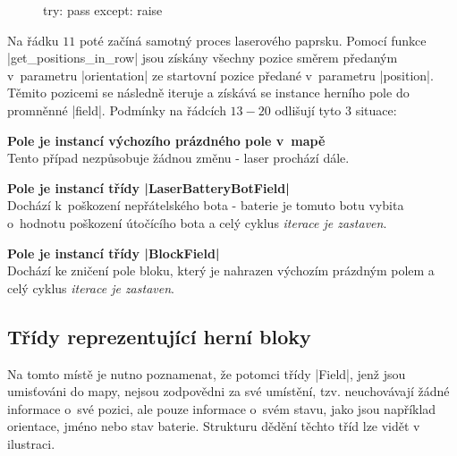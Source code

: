 {\begin{figure}[!h]
\begin{minipage}[b][50\lineheight]{.47\textwidth}
    \begin{code}
try:
    pass
except:
    raise
    \end{code}
    \end{minipage}
    
\end{figure}

\begin{sloppypar}
    Na řádku $11$ poté začíná samotný proces laserového paprsku. Pomocí funkce \ic|get_positions_in_row| jsou získány všechny pozice směrem předaným v~parametru \ic|orientation| ze startovní pozice předané v~parametru \ic|position|. Těmito pozicemi se následně iteruje a získává se instance herního pole do promněnné \ic|field|. Podmínky na řádcích $13-20$ odlišují tyto 3 situace:
\end{sloppypar}

\begin{description}
    \item {\bfseries Pole je instancí výchozího prázdného pole v~mapě} \\
        Tento případ nezpůsobuje žádnou změnu - laser prochází dále.

    \item {\bfseries Pole je instancí třídy \ic|LaserBatteryBotField|} \\
        Dochází k~poškození nepřátelského bota - baterie je tomuto botu vybita o~hodnotu poškození útočícího bota a celý cyklus \emph{iterace je zastaven}.

    \item {\bfseries Pole je instancí třídy \ic|BlockField|} \\
        Dochází ke zničení pole bloku, který je nahrazen výchozím prázdným polem a celý cyklus \emph{iterace je zastaven}.
\end{description}
} %

\subsection{Třídy reprezentující herní bloky}

Na tomto místě je nutno poznamenat, že potomci třídy \ic|Field|, jenž jsou umisťováni do mapy, nejsou zodpovědni za své umístění, tzv. neuchovávají žádné informace o~své pozici, ale pouze informace o~svém stavu, jako jsou například orientace, jméno nebo stav baterie. Strukturu dědění těchto tříd lze vidět v ilustraci.

